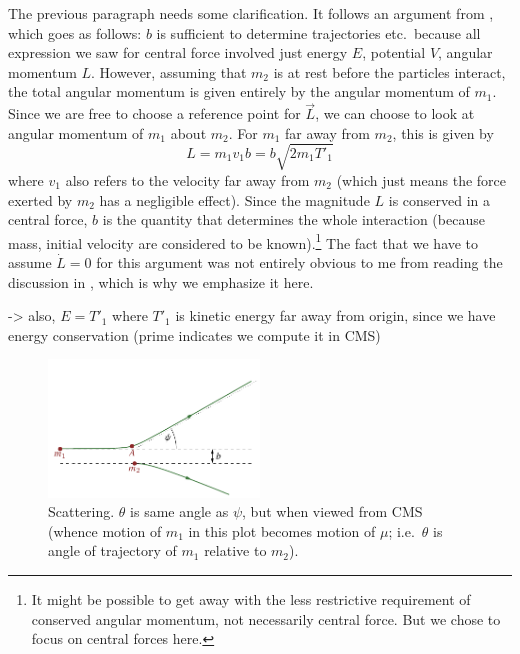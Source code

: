 \documentclass[../class_mech_main.tex]{subfiles}
\begin{document}
The previous paragraph needs some clarification. It follows an argument from \cite{Thornton_2003}, which goes as follows: $b$ is sufficient to determine trajectories etc.~because all expression we saw for central force involved just energy $E$, potential $V$, angular momentum $L$. However, assuming that $m_2$ is at rest before the particles interact, the total angular momentum is given entirely by the angular momentum of $m_1$. Since we are free to choose a reference point for $\vec{L}$, we can choose to look at angular momentum of $m_1$ about $m_2$. For $m_1$ far away from $m_2$, this is given by
\begin{equation}
	L = m_1 v_1 b = b \sqrt{2 m_1 T'_1}
\end{equation}
where $v_1$ also refers to the velocity far away from $m_2$ (which just means the force exerted by $m_2$ has a negligible effect). Since the magnitude $L$ is conserved in a central force, $b$ is the quantity that determines the whole interaction (because mass, initial velocity are considered to be known).\footnote{It might be possible to get away with the less restrictive requirement of conserved angular momentum, not necessarily central force. But we chose to focus on central forces here.} The fact that we have to assume $\dot{L} = 0$ for this argument was not entirely obvious to me from reading the discussion in \cite{Thornton_2003}, which is why we emphasize it here.

-> also, $E = T'_1$ where $T'_1$ is kinetic energy far away from origin, since we have energy conservation (prime indicates we compute it in CMS)




\begin{figure}
	\centering

	\includegraphics[width=0.5\textwidth]{pictures/scattering.pdf}

	\caption{Scattering. $\theta$ is same angle as $\psi$, but when viewed from CMS (whence motion of $m_1$ in this plot becomes motion of $\mu$; i.e.~$\theta$ is angle of trajectory of $m_1$ relative to $m_2$).}
	\label{fig:scattering}
\end{figure}
\end{document}
